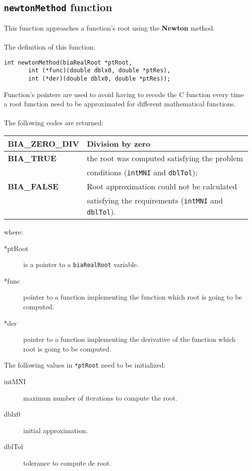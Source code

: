 \subsection{\texttt{newtonMethod} function}

This function approaches a function's root using the \textbf{Newton} method.\\ \\
%
The definition of this function:
%
\begin{verbatim}
int newtonMethod(biaRealRoot *ptRoot, 
       int (*func)(double dblx0, double *ptRes),
       int (*der)(double dblx0, double *ptRes));  
\end{verbatim}
%
Function's pointers are used to avoid having to recode the C function every time a root function need to be approximated for different mathematical functions.\\ \\
%
The following codes are returned:
%
\begin{center}
\begin{tabular}{|l|l|}
\hline
\textbf{BIA\_ZERO\_DIV} & Division by zero \\
\hline
\textbf{BIA\_TRUE} & the root was computed satisfying the problem \\
                   & conditions (\texttt{intMNI} and \texttt{dblTol}); \\
\hline
\textbf{BIA\_FALSE} & Root approximation could not be calculated \\
                    & satisfying the requirements (\texttt{intMNI} and \texttt{dblTol}). \\
\hline
\end{tabular}
\end{center}
%
where:
%
\begin{description}
\item[*ptRoot] is a pointer to a \texttt{biaRealRoot} variable.
\item[*func] pointer to a function implementing the function which root is going to be computed.
\item[*der] pointer to a function implementing the derivative of the function which root is going to be computed.
\end{description}
%
The following values in \texttt{*ptRoot} need to be initialized:
%
\begin{description}
\item[intMNI] maximun number of iterations to compute the root.
\item[dblx0] initial approximation.
\item[dblTol] tolerance to compute de root.
\end{description}

